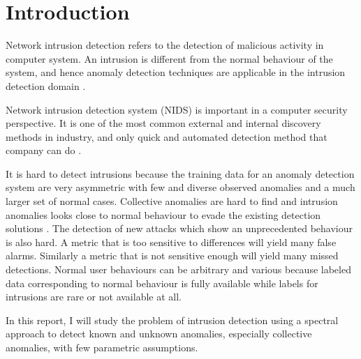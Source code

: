 \section{Introduction}
Network intrusion detection refers to the detection of malicious activity in computer system. 
An intrusion is different from the normal behaviour of the system, and hence anomaly detection techniques are applicable in the intrusion detection domain \cite{chandola09}.

Network intrusion detection system (NIDS) is important in a computer security perspective. 
It is one of the most common external and internal discovery methods in industry, and only quick and automated detection method that company can do \cite{verizon14}. 

It is hard to detect intrusions because the training data for an anomaly detection system are very asymmetric with few and diverse observed anomalies and a much larger set of normal cases. 
Collective anomalies are hard to find and intrusion anomalies looks close to normal behaviour to evade the existing detection solutions \cite{chandola09}. 
The detection of new attacks which show an unprecedented behaviour is also hard. 
A metric that is too sensitive to differences will yield many false alarms. 
Similarly a metric that is not sensitive enough will yield many missed detections. 
Normal user behaviours can be arbitrary and various because labeled data corresponding to normal behaviour is fully available while labels for intrusions are rare or not available at all. 

In this report, I will study the problem of intrusion detection using a spectral approach to detect known and unknown anomalies, especially collective anomalies, with few parametric assumptions. 
